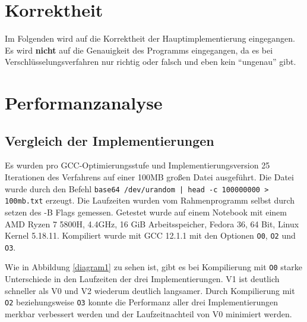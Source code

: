 \documentclass[course=erap]{aspdoc}
\begin{document}
\section{Korrektheit}
Im Folgenden wird auf die Korrektheit der Hauptimplementierung eingegangen.
Es wird \textbf{nicht} auf die Genauigkeit des Programms eingegangen, da es bei Ver\-schlüsse\-lungsverfahren
nur richtig oder falsch und eben kein ``ungenau'' gibt.

\section{Performanzanalyse}
\subsection{Vergleich der Implementierungen}
Es wurden pro GCC-Optimierungsstufe und Implementierungsversion 25 
Iterationen des Verfahrens auf einer 100MB großen Datei ausgeführt. Die Datei
wurde durch den Befehl \texttt{base64 /dev/urandom | head -c 100000000 > 100mb.txt}
erzeugt.
Die Laufzeiten wurden vom Rahmenprogramm selbst durch setzen des -B Flags
gemessen. Getestet wurde auf einem Notebook mit einem AMD Ryzen 7 5800H, 
4.4GHz, 16 GiB Arbeitsspeicher, Fedora 36, 64 Bit, Linux Kernel 5.18.11.
Kompiliert wurde mit GCC 12.1.1 mit den Optionen \texttt{O0}, \texttt{O2} und \texttt{O3}.

\begin{center}
\label{diagram1}
\end{center}
Wie in Abbildung \ref{diagram1} zu sehen ist, gibt es bei Kompilierung mit \texttt{O0} starke
Unterschiede in den Laufzeiten der drei Implementierungen. V1 ist deutlich schneller als V0 
und V2 wiederum deutlich langsamer. Durch Kompilierung mit \texttt{O2} beziehungsweise \texttt{O3}
konnte die Performanz aller drei Implementierungen merkbar verbessert werden und der Laufzeitnachteil
von V0 minimiert werden.
\end{document}
